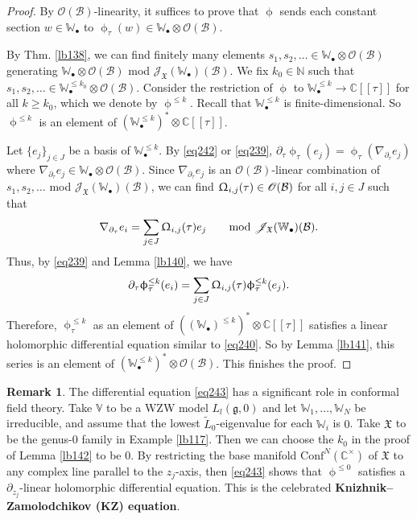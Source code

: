 \documentclass[12pt,a4paper,notitlepage]{article}
\theoremstyle{definition}
\newtheorem{rem}[df]{Remark}
\theoremstyle{plain}
\newcommand{\fk}{\mathfrak}
\newcommand{\mc}{\mathcal}
\newcommand{\wtd}{\widetilde}
\newcommand{\Conf}{\mathrm{Conf}}
\newcommand{\scr}{\mathscr}
\newcommand{\gk}{\mathfrak g}
\newcommand{\blt}{\bullet}
\newcommand{\Vbb}{\mathbb V}
\newcommand{\Wbb}{\mathbb W}
\newcommand{\Cbb}{\mathbb C}
\newcommand{\Nbb}{\mathbb N}
\numberwithin{equation}{section}
\begin{document}
\begin{proof}
By $\scr O(\mc B)$-linearity, it suffices to prove that $\upphi$ sends each constant section $w\in\Wbb_\blt$ to $\upphi_\tau(w)\in\Wbb_\blt\otimes\scr O(\mc B)$.

By Thm. \ref{lb138}, we can find finitely many elements $s_1,s_2,\dots\in\Wbb_\blt\otimes\scr O(\mc B)$ generating $\Wbb_\blt\otimes\scr O(\mc B)$ mod $\scr J_{\fk X}(\Wbb_\blt)(\mc B)$. We fix $k_0\in\Nbb$ such that $s_1,s_2,\dots\in\Wbb_\blt^{\leq k_0}\otimes\scr O(\mc B)$. Consider the restriction of $\upphi$ to $\Wbb_\blt^{\leq k}\rightarrow \Cbb[[\tau]]$ for all $k\geq k_0$, which we denote by $\upphi^{\leq k}$. Recall that $\Wbb_\blt^{\leq k}$ is finite-dimensional.  So $\upphi^{\leq k}$ is an element of $(\Wbb_\blt^{\leq k})^*\otimes\Cbb[[\tau]]$.

Let $\{e_j\}_{j\in J}$ be a basis of $\Wbb_\blt^{\leq k}$. By \eqref{eq242} or \eqref{eq239}, $\partial_\tau\upphi_\tau(e_j)=\upphi_\tau(\nabla_{\partial_\tau} e_j)$ where $\nabla_{\partial_\tau} e_j\in\Wbb_\blt\otimes\scr O(\mc B)$. Since $\nabla_{\partial_\tau} e_j$ is an $\scr O(\mc B)$-linear combination of $s_1,s_2,\dots$ mod $\scr J_{\fk X}(\Wbb_\blt)(\mc B)$, we can find $\Upomega_{i,j}(\tau)\in\scr O(\mc B)$ for all $i,j\in J$ such that
\begin{align*}
\nabla_{\partial_\tau} e_i=\sum_{j\in J}\Upomega_{i,j}(\tau)e_j\qquad\text{mod }\scr J_{\fk X}(\Wbb_\blt)(\mc B).
\end{align*}
Thus, by \eqref{eq239} and Lemma \ref{lb140}, we have
\begin{align}
\partial_\tau\upphi_\tau^{\leq k}(e_i)=\sum_{j\in J}\Upomega_{i,j}(\tau)\upphi_\tau^{\leq k}(e_j).\label{eq243}
\end{align}
Therefore,  $\upphi_\tau^{\leq k}$ as an element of $((\Wbb_\blt)^{\leq k})^*\otimes\Cbb[[\tau]]$ satisfies a linear holomorphic differential equation similar to \eqref{eq240}. So by Lemma \ref{lb141}, this series is an element of $(\Wbb_\blt^{\leq k})^*\otimes\scr O(\mc B)$. This finishes the proof.
\end{proof}



\begin{rem}
The differential equation \eqref{eq243} has a significant role in conformal field theory. Take $\Vbb$ to be a WZW model $L_l(\gk,0)$ and let $\Wbb_1,\dots,\Wbb_N$ be irreducible, and assume that the lowest $\wtd L_0$-eigenvalue for each $\Wbb_i$ is $0$. Take $\fk X$ to be the genus-$0$ family in Example \ref{lb117}. Then we can choose the $k_0$ in the proof of Lemma \ref{lb142} to be $0$. By restricting the base manifold $\Conf^N(\Cbb^\times)$ of $\fk X$ to any complex line parallel to the $z_j$-axis, then \eqref{eq243} shows that $\upphi^{\leq 0}$ satisfies a $\partial_{z_j}$-linear holomorphic differential equation. This is the celebrated \textbf{Knizhnik–Zamolodchikov (KZ) equation}.
\end{rem}
\end{document}
